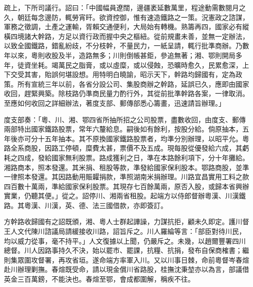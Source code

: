 \begin{pinyinscope}
疏上，下所司議行。詔曰：「中國幅員遼闊，邊疆袤延數萬里，程途動需數閱月之久，朝廷每念邊防，輒勞宵旰。欲資控御，惟有速造鐵路之一策。況憲政之諮謀，軍務之徵調，土產之運輸，胥賴交通便利，大局始有轉機。熟籌再四，國家必有縱橫四境諸大幹路，方足以資行政而握中央之樞紐。從前規畫未善，並無一定辦法，以致全國鐵路，錯亂紛歧，不分枝幹，不量民力，一紙呈請，輒行批準商辦。乃數年以來，粵則收股及半，造路無多；川則倒帳甚鉅，參追無著；湘、鄂則開局多年，徒資坐耗。竭萬民之脂膏，或以虛糜，或以侵蝕，恐曠時愈久，民累愈深，上下交受其害，貽誤何堪設想。用特明白曉諭，昭示天下，幹路均歸國有，定為政策。所有宣統三年以前，各省分設公司、集股商辦之幹路，延誤已久，應即由國家收回，趕緊興築。除枝路仍準商民量力酌行外，其從前批準幹路各案，一律取消。至應如何收回之詳細辦法，著度支部、郵傳部悉心籌畫，迅速請旨辦理。」

度支部奏：「粵、川、湘、鄂四省所抽所招之公司股票，盡數收回，由度支、郵傳兩部特出國家鐵路股票，常年六釐給息。嗣後如有餘利，按股分給。倘原抽本，五年後亦可分十五年抽本。其不原換國家鐵路股票者，均準分別辦理，以昭平允。粵路全系商股，因路工停頓，糜費太甚，票價不及五成。現每股從優發給六成，其虧耗之四成，發給國家無利股票。路成獲利之日，準在本路餘利項下，分十年攤給。湘路商本，照本發還。其米捐、租股等款，準發給國家保利股本。鄂路商股，並準一律照本發還。其因路動用賑糶捐款，準照湖南米捐辦理。川路宜昌實用工料之款四百數十萬兩，準給國家保利股票。其現存七百餘萬兩，原否入股，或歸本省興辦實業，仍聽其便。」從之。詔停川、湘兩省租股。起端方以侍郎督辦粵漢、川漢鐵路。其粵漢、川漢，英、德、法三國借款，亦即簽訂。

方幹路收歸國有之詔既頒，湘、粵人士群起譁譟，力謀抗拒，顧未久即定。護川督王人文代陳川諮議局請緩接收川路，詔旨斥之。川人羅綸等言：「部臣對待川民，均以威力從事，毫不持平。」人文復據以上聞，仍嚴斥之。未幾，以趙爾豐署四川總督。川人因路事持久不決，始以罷市、罷課，抗糧、抗捐，發布自保商榷書；繼則集眾圍攻督署，再攻省垣。遂命端方率軍入川。又以川事日棘，命前粵督岑春煊赴川辦理剿撫。春煊既受命，請以現金償川省路股，桂撫沈秉堃亦以為言，部議借英金三百萬鎊，不能決也。春煊至鄂，會成都圍解，稱疾不往。


\end{pinyinscope}
